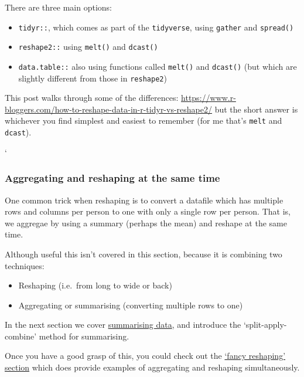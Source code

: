 \documentclass[]{article}
\providecommand{\tightlist}{%
  \setlength{\itemsep}{0pt}\setlength{\parskip}{0pt}}
\begin{document}
There are three main options:

\begin{itemize}
\tightlist
\item
  \texttt{tidyr::}, which comes as part of the \texttt{tidyverse}, using \texttt{gather} and
  \texttt{spread()}
\item
  \texttt{reshape2::} using \texttt{melt()} and \texttt{dcast()}
\item
  \texttt{data.table::} also using functions called \texttt{melt()} and \texttt{dcast()} (but which
  are slightly different from those in \texttt{reshape2})
\end{itemize}

This post walks through some of the differences:
\url{https://www.r-bloggers.com/how-to-reshape-data-in-r-tidyr-vs-reshape2/} but the
short answer is whichever you find simplest and easiest to remember (for me
that's \texttt{melt} and \texttt{dcast}).

`

\hypertarget{aggregating-and-reshaping-at-the-same-time}{%
\subsubsection*{Aggregating and reshaping at the same time}\label{aggregating-and-reshaping-at-the-same-time}}

One common trick when reshaping is to convert a datafile which has multiple rows
and columns per person to one with only a single row per person. That is, we
aggregae by using a summary (perhaps the mean) and reshape at the same time.

Although useful this isn't covered in this section, because it is combining two
techniques:

\begin{itemize}
\tightlist
\item
  Reshaping (i.e.~from long to wide or back)
\item
  Aggregating or summarising (converting multiple rows to one)
\end{itemize}

In the next section we cover \protect\hyperlink{summarising-data}{summarising data}, and
introduce the `split-apply-combine' method for summarising.

Once you have a good grasp of this, you could check out the
\protect\hyperlink{fancy-reshaping}{`fancy reshaping' section} which does provide examples of
aggregating and reshaping simultaneously.
\end{document}
